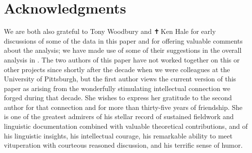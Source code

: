 \documentclass[output=paper,colorlinks,citecolor=brown]{langscibook}
\begin{document}
\section*{Acknowledgments}


   We are both also grateful to Tony Woodbury and ✝\,Ken Hale for
   early discussions of some of the data in this paper and for
   offering valuable comments about the analysis; we have made use of
   some of their suggestions in the overall analysis in .  
   The two authors of this paper have not worked together on this or
   other projects since shortly after the decade when we were
   colleagues at the University of Pittsburgh, but the first author
   views the current version of this paper as arising from the
   wonderfully stimulating intellectual connection we forged during
   that decade.  She wishes to express her gratitude to the second
   author for that connection and for more than thirty-five years of
   friendship.  She is one of the greatest admirers of his stellar
   record of sustained fieldwork and linguistic documentation
   combined with valuable theoretical contributions, and of his
   linguistic insights, his intellectual courage, his remarkable
   ability to meet vituperation with courteous reasoned discussion,
   and his terrific sense of humor.

\printbibliography[heading=subbibliography,notkeyword=this]
\end{document}
